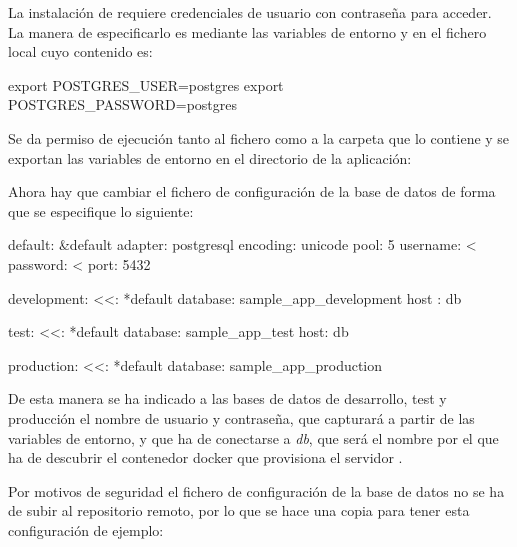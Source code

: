 La instalación de  requiere credenciales de usuario con contraseña para acceder. La manera de especificarlo es mediante las variables de entorno  y  en el fichero local  cuyo contenido es:

\begin{codelisting}
\label{code:credentials}
\begin{code}
export POSTGRES_USER=postgres
export POSTGRES_PASSWORD=postgres
\end{code}
\end{codelisting}

Se da permiso de ejecución tanto al fichero como a la carpeta que lo contiene y se exportan las variables de entorno en el directorio de la aplicación:


Ahora hay que cambiar el fichero de configuración de la base de datos de forma que se especifique lo siguiente:

\begin{codelisting}
\label{code:database}
\begin{code}
default: &default
  adapter: postgresql
  encoding: unicode
  pool: 5
  username: <%
  password: <%
  port: 5432

development:
  <<: *default
  database: sample_app_development  
  host : db

test:
  <<: *default
  database: sample_app_test
  host: db

production:
  <<: *default
  database: sample_app_production
\end{code}
\end{codelisting}

De esta manera se ha indicado a las bases de datos de desarrollo, test y producción el nombre de usuario y contraseña, que capturará a partir de las variables de entorno, y que ha de conectarse a \textit{db}, que será el nombre por el que ha de descubrir el contenedor docker que provisiona el servidor .

Por motivos de seguridad el fichero de configuración de la base de datos no se ha de subir al repositorio remoto, por lo que se hace una copia para tener esta configuración de ejemplo:

